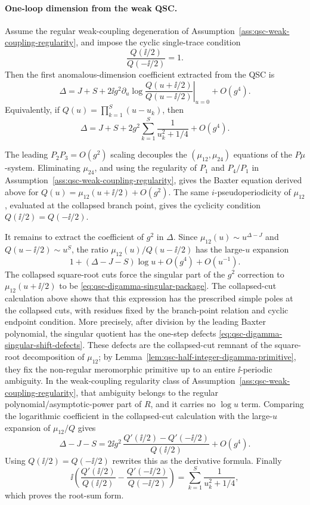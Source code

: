 \paragraph{One-loop dimension from the weak QSC.}
\label{par:qsc-one-loop-dimension}
Assume the regular weak-coupling degeneration of
Assumption~\ref{ass:qsc-weak-coupling-regularity}, and impose the cyclic
single-trace condition
\[
  \frac{Q(\ii/2)}{Q(-\ii/2)}=1 .
\]
Then the first anomalous-dimension coefficient extracted from the QSC is
\[
  \Delta
  =
  J+S
  +2\ii g^2
  \left.
    \partial_u\log\frac{Q(u+\ii/2)}{Q(u-\ii/2)}
  \right|_{u=0}
  +O(g^4).
\]
Equivalently, if \(Q(u)=\prod_{k=1}^S(u-u_k)\), then
\[
  \Delta
  =
  J+S
  +2g^2\sum_{k=1}^S\frac1{u_k^2+1/4}
  +O(g^4).
\]

The leading \(P_2P_3=O(g^2)\) scaling decouples the
\((\mu_{12},\mu_{24})\) equations of the \(P\mu\)-system.  Eliminating
\(\mu_{24}\), and using the regularity of \(P_1\) and \(P_4/P_1\) in
Assumption~\ref{ass:qsc-weak-coupling-regularity}, gives the Baxter equation
derived above for
\(Q(u)=\mu_{12}(u+\ii/2)+O(g^2)\).  The same \(i\)-pseudoperiodicity of
\(\mu_{12}\), evaluated at the collapsed branch point, gives the cyclicity
condition \(Q(\ii/2)=Q(-\ii/2)\).

It remains to extract the coefficient of \(g^2\) in \(\Delta\).  Since
\(\mu_{12}(u)\sim u^{\Delta-J}\) and \(Q(u-\ii/2)\sim u^S\), the ratio
\(\mu_{12}(u)/Q(u-\ii/2)\) has the large-\(u\) expansion
\[
  1+(\Delta-J-S)\log u+O(g^4)+O(u^{-1}).
\]
The collapsed square-root cuts force the singular part of the \(g^2\)
correction to \(\mu_{12}(u+\ii/2)\) to be
\eqref{eq:qsc-digamma-singular-package}.  The collapsed-cut calculation above
shows that this expression has the
prescribed simple poles at the collapsed cuts, with residues fixed by the
branch-point relation and cyclic endpoint condition.  More precisely, after
division by the leading Baxter polynomial, the singular quotient has the
one-step defects \eqref{eq:qsc-digamma-singular-shift-defects}.  These
defects are the collapsed-cut remnant of the square-root decomposition of
\(\mu_{12}\); by Lemma~\ref{lem:qsc-half-integer-digamma-primitive}, they fix
the non-regular meromorphic primitive up to an entire \(\ii\)-periodic
ambiguity.  In the weak-coupling regularity class of
Assumption~\ref{ass:qsc-weak-coupling-regularity}, that ambiguity belongs to
the regular polynomial/asymptotic-power part of \(R\), and it carries no
\(\log u\) term.  Comparing the logarithmic coefficient in the collapsed-cut
calculation with the large-\(u\) expansion of \(\mu_{12}/Q\) gives
\[
  \Delta-J-S
  =
  2\ii g^2\,\frac{Q'(\ii/2)-Q'(-\ii/2)}{Q(\ii/2)}+O(g^4).
\]
Using \(Q(\ii/2)=Q(-\ii/2)\) rewrites this as the derivative formula.  Finally
\[
  \ii\left(
  \frac{Q'(\ii/2)}{Q(\ii/2)}
  -
  \frac{Q'(-\ii/2)}{Q(-\ii/2)}
  \right)
  =
  \sum_{k=1}^S\frac1{u_k^2+1/4},
\]
which proves the root-sum form.

